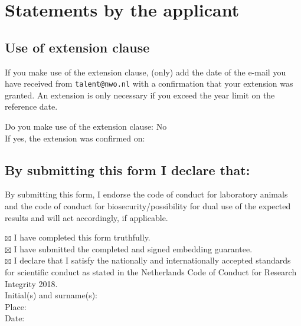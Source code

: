 \documentclass[a4paper,9.5pt,fleqn]{application}
\begin{document}
\newpage

\section*{Statements by the applicant}
\subsection*{Use of extension clause }
If you make use of the extension clause, (only) add the date of the e-mail you have received from \texttt{talent@nwo.nl} with a confirmation that your extension was granted. An extension is only necessary if you exceed the year limit on the reference date. 

\noindent Do you make use of the extension clause: No\\
If yes, the extension was confirmed on:


\subsection*{By submitting this form I declare that:}
By submitting this form, I endorse the code of conduct for laboratory animals and the code of conduct for biosecurity/possibility for dual use of the expected results and will act accordingly, if applicable.

\noindent $\boxtimes$ I have completed this form truthfully.\\
$\boxtimes$ I have submitted the completed and signed embedding guarantee.\\
$\boxtimes$ I declare that I satisfy the nationally and internationally accepted standards for scientific conduct as stated in the Netherlands Code of Conduct for Research Integrity 2018.\\[1cm]

\noindent Initial(s) and surname(s):\\
Place:\\
Date:\\


\fi

\nocite{*}


\end{document}
